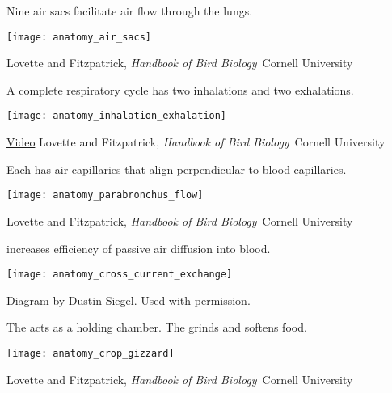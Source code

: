 \documentclass[t]{beamer}
\begin{document}
{
\begin{frame}[t,plain]{Nine air sacs facilitate air flow through the lungs.}

	\vspace{-0.5\baselineskip}
	
	\centering
	
	\texttt{[image: anatomy\_air\_sacs]}
	
	\vfilll
	
	\tiny \hfill Lovette and Fitzpatrick, \textit{Handbook of Bird Biology} \textcopyright\,Cornell University
\end{frame}
}
%
\begin{frame}[t,plain]{A complete respiratory cycle has two inhalations and two exhalations.}

	\texttt{[image: anatomy\_inhalation\_exhalation]}
		
	\vfilll
	
	\tiny \href{https://www.youtube.com/watch?v=kWMmyVu1ueY}{Video} \hfill Lovette and Fitzpatrick, \textit{Handbook of Bird Biology} \textcopyright\,Cornell University
\end{frame}
\begin{frame}[t,plain]{Each  has air capillaries that align perpendicular to blood capillaries.}

	\texttt{[image: anatomy\_parabronchus\_flow]}
		
	\vfilll
	
	\tiny \hfill Lovette and Fitzpatrick, \textit{Handbook of Bird Biology} \textcopyright\,Cornell University

\end{frame}

\begin{frame}[t,plain]{ increases efficiency of passive air diffusion into blood.}

	\centering
	
	\texttt{[image: anatomy\_cross\_current\_exchange]}
		
	\vfilll
	
	\tiny \hfill Diagram by Dustin Siegel. Used with permission.
\end{frame}


\begin{frame}[t]{The  acts as a holding chamber. The  grinds and softens food.}

	\vspace{-\baselineskip}
	
	\centering
	
	\texttt{[image: anatomy\_crop\_gizzard]}
		
	\vfilll
	
	\tiny \hfill Lovette and Fitzpatrick, \textit{Handbook of Bird Biology} \textcopyright\,Cornell University

\end{frame}
\end{document}

